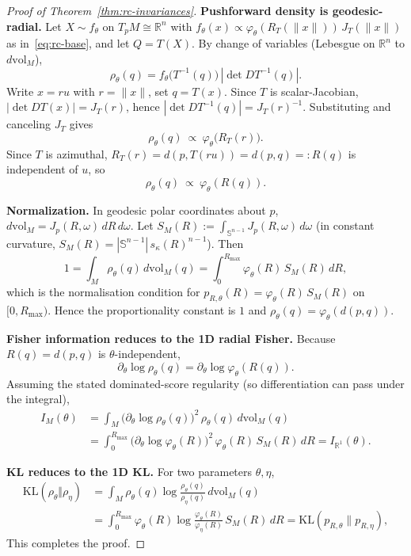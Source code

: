 \documentclass{article}
\newcommand{\KL}{\mathrm{KL}}
\theoremstyle{definition}
\theoremstyle{remark}
\newcommand{\RR}{\mathbb{R}}
\newcommand{\SSS}{\mathbb{S}}
\begin{document}
\begin{proof}[Proof of Theorem~\ref{thm:rc-invariances}]
\textbf{Pushforward density is geodesic-radial.}
Let $X\sim f_\theta$ on $T_pM\cong\RR^n$ with
$f_\theta(x)\propto \varphi_\theta(R_T(\|x\|))\,J_T(\|x\|)$ as in~\eqref{eq:rc-base},
and let $Q=T(X)$.
By change of variables (Lebesgue on $\RR^n$ to $d\mathrm{vol}_M$),
\[
\rho_\theta(q)
=
f_\theta\!\bigl(T^{-1}(q)\bigr)\,|\det DT^{-1}(q)|.
\]
Write $x=ru$ with $r=\|x\|$, set $q=T(x)$.
Since $T$ is scalar-Jacobian, $|\det DT(x)|=J_T(r)$, hence
$|\det DT^{-1}(q)|=J_T(r)^{-1}$.
Substituting and canceling $J_T$ gives
\[
\rho_\theta(q)\ \propto\ \varphi_\theta\!\bigl(R_T(r)\bigr).
\]
Since $T$ is azimuthal, $R_T(r)=d(p,T(ru))=d(p,q)=:R(q)$ is independent of $u$, so
\[
\rho_\theta(q)\ \propto\ \varphi_\theta(R(q)).
\]

\textbf{Normalization.}
In geodesic polar coordinates about $p$, $d\mathrm{vol}_M=J_p(R,\omega)\,dR\,d\omega$.
Let $S_M(R):=\int_{\SSS^{n-1}}J_p(R,\omega)\,d\omega$ (in constant curvature,
$S_M(R)=|\SSS^{n-1}|\,s_\kappa(R)^{n-1}$).
Then
\[
1=\int_M \rho_\theta(q)\,d\mathrm{vol}_M(q)
=\int_0^{R_{\max}}\!\!\varphi_\theta(R)\,S_M(R)\,dR,
\]
which is the normalisation condition for $p_{R,\theta}(R)=\varphi_\theta(R)\,S_M(R)$ on $[0,R_{\max})$.
Hence the proportionality constant is $1$ and $\rho_\theta(q)=\varphi_\theta(d(p,q))$.

\textbf{Fisher information reduces to the 1D radial Fisher.}
Because $R(q)=d(p,q)$ is $\theta$-independent,
\[
\partial_\theta\log\rho_\theta(q)
=
\partial_\theta\log\varphi_\theta(R(q)).
\]
Assuming the stated dominated-score regularity (so differentiation can pass under the integral),
\begin{align*}
I_M(\theta)
&=
\int_M \bigl(\partial_\theta\log\rho_\theta(q)\bigr)^2\,\rho_\theta(q)\,d\mathrm{vol}_M(q)\\
&=
\int_0^{R_{\max}}
\bigl(\partial_\theta\log\varphi_\theta(R)\bigr)^2\,\varphi_\theta(R)\,S_M(R)\,dR
= I_{\RR^1}(\theta).
\end{align*}

\textbf{KL reduces to the 1D KL.}
For two parameters $\theta,\eta$,
\begin{align*}
\mathrm{KL}(\rho_\theta\Vert\rho_\eta)
&=\int_M \rho_\theta(q)\log\frac{\rho_\theta(q)}{\rho_\eta(q)}\,d\mathrm{vol}_M(q)\\
&=\int_0^{R_{\max}}\varphi_\theta(R)\log\frac{\varphi_\theta(R)}{\varphi_\eta(R)}\,S_M(R)\,dR=\KL(p_{R,\theta}\|p_{R,\eta}),
\end{align*}
This completes the proof.
\end{proof}
\end{document}
